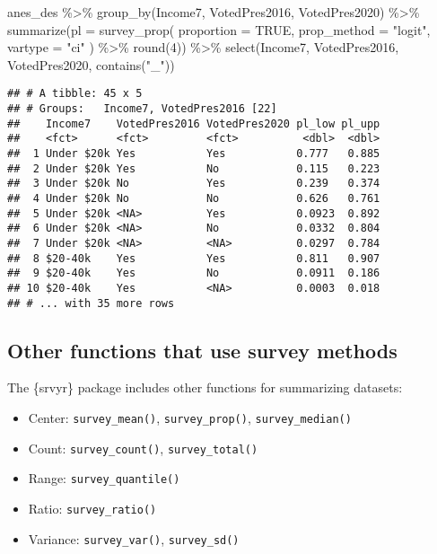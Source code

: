 \documentclass[
]{krantz}
\makeatletter
\newenvironment{Shaded}{\begin{snugshade}}{\end{snugshade}}
\newcommand{\AttributeTok}[1]{\textcolor[rgb]{0.61,0.61,0.61}{#1}}
\newcommand{\ConstantTok}[1]{\textcolor[rgb]{0,0,0}{#1}}
\newcommand{\DecValTok}[1]{\textcolor[rgb]{0.06,0.06,0.06}{#1}}
\newcommand{\FunctionTok}[1]{\textcolor[rgb]{0,0,0}{#1}}
\newcommand{\NormalTok}[1]{#1}
\newcommand{\SpecialCharTok}[1]{\textcolor[rgb]{0,0,0}{#1}}
\newcommand{\StringTok}[1]{\textcolor[rgb]{0.5,0.5,0.5}{#1}}
\providecommand{\tightlist}{%
  \setlength{\itemsep}{0pt}\setlength{\parskip}{0pt}}
\newenvironment{kframe}{%
\medskip{}
\setlength{\fboxsep}{.8em}
 \def\at@end@of@kframe{}%
 \ifinner\ifhmode%
  \def\at@end@of@kframe{\end{minipage}}%
  \begin{minipage}{\columnwidth}%
 \fi\fi%
 \def\FrameCommand##1{\hskip\@totalleftmargin \hskip-\fboxsep
 \colorbox{shadecolor}{##1}\hskip-\fboxsep
     \hskip-\linewidth \hskip-\@totalleftmargin \hskip\columnwidth}%
 \MakeFramed {\advance\hsize-\width
   \@totalleftmargin\z@ \linewidth\hsize
   \@setminipage}}%
 {\par\unskip\endMakeFramed%
 \at@end@of@kframe}
\renewenvironment{Shaded}{\begin{kframe}}{\end{kframe}}
\makeatother
\begin{document}
\begin{Shaded}
\begin{Highlighting}[]
\NormalTok{anes\_des }\SpecialCharTok{\%\textgreater{}\%}
  \FunctionTok{group\_by}\NormalTok{(Income7, VotedPres2016, VotedPres2020) }\SpecialCharTok{\%\textgreater{}\%}
  \FunctionTok{summarize}\NormalTok{(}\AttributeTok{pl =} \FunctionTok{survey\_prop}\NormalTok{(}
    \AttributeTok{proportion =} \ConstantTok{TRUE}\NormalTok{,}
    \AttributeTok{prop\_method =} \StringTok{"logit"}\NormalTok{,}
    \AttributeTok{vartype =} \StringTok{"ci"}
\NormalTok{  ) }\SpecialCharTok{\%\textgreater{}\%} \FunctionTok{round}\NormalTok{(}\DecValTok{4}\NormalTok{)) }\SpecialCharTok{\%\textgreater{}\%} 
  \FunctionTok{select}\NormalTok{(Income7, VotedPres2016, VotedPres2020, }\FunctionTok{contains}\NormalTok{(}\StringTok{"\_"}\NormalTok{))}
\end{Highlighting}
\end{Shaded}

\begin{verbatim}
## # A tibble: 45 x 5
## # Groups:   Income7, VotedPres2016 [22]
##    Income7    VotedPres2016 VotedPres2020 pl_low pl_upp
##    <fct>      <fct>         <fct>          <dbl>  <dbl>
##  1 Under $20k Yes           Yes           0.777   0.885
##  2 Under $20k Yes           No            0.115   0.223
##  3 Under $20k No            Yes           0.239   0.374
##  4 Under $20k No            No            0.626   0.761
##  5 Under $20k <NA>          Yes           0.0923  0.892
##  6 Under $20k <NA>          No            0.0332  0.804
##  7 Under $20k <NA>          <NA>          0.0297  0.784
##  8 $20-40k    Yes           Yes           0.811   0.907
##  9 $20-40k    Yes           No            0.0911  0.186
## 10 $20-40k    Yes           <NA>          0.0003  0.018
## # ... with 35 more rows
\end{verbatim}

\hypertarget{other-functions-that-use-survey-methods}{%
\subsection{Other functions that use survey methods}\label{other-functions-that-use-survey-methods}}

The \{srvyr\} package includes other functions for summarizing datasets:

\begin{itemize}
\tightlist
\item
  Center: \texttt{survey\_mean()}, \texttt{survey\_prop()}, \texttt{survey\_median()}
\item
  Count: \texttt{survey\_count()}, \texttt{survey\_total()}
\item
  Range: \texttt{survey\_quantile()}
\item
  Ratio: \texttt{survey\_ratio()}
\item
  Variance: \texttt{survey\_var()}, \texttt{survey\_sd()}
\end{itemize}
\end{document}
